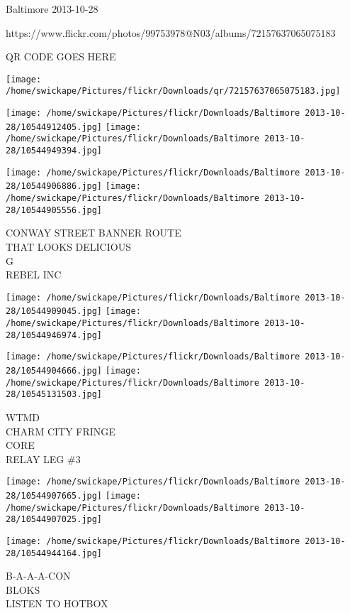 \documentclass[10pt,letterpaper]{article}
\begin{document}
Baltimore 2013-10-28

https://www.flickr.com/photos/99753978@N03/albums/72157637065075183

QR CODE GOES HERE

\texttt{[image: /home/swickape/Pictures/flickr/Downloads/qr/72157637065075183.jpg]}
\pagebreak

\texttt{[image: /home/swickape/Pictures/flickr/Downloads/Baltimore 2013-10-28/10544912405.jpg]}
\texttt{[image: /home/swickape/Pictures/flickr/Downloads/Baltimore 2013-10-28/10544949394.jpg]}

\texttt{[image: /home/swickape/Pictures/flickr/Downloads/Baltimore 2013-10-28/10544906886.jpg]}
\texttt{[image: /home/swickape/Pictures/flickr/Downloads/Baltimore 2013-10-28/10544905556.jpg]}

CONWAY STREET BANNER ROUTE\\
THAT LOOKS DELICIOUS\\
G\\
REBEL INC\\
\pagebreak

\texttt{[image: /home/swickape/Pictures/flickr/Downloads/Baltimore 2013-10-28/10544909045.jpg]}
\texttt{[image: /home/swickape/Pictures/flickr/Downloads/Baltimore 2013-10-28/10544946974.jpg]}

\texttt{[image: /home/swickape/Pictures/flickr/Downloads/Baltimore 2013-10-28/10544904666.jpg]}
\texttt{[image: /home/swickape/Pictures/flickr/Downloads/Baltimore 2013-10-28/10545131503.jpg]}

WTMD\\
CHARM CITY FRINGE\\
CORE\\
RELAY LEG \#3\\
\pagebreak

\texttt{[image: /home/swickape/Pictures/flickr/Downloads/Baltimore 2013-10-28/10544907665.jpg]}
\texttt{[image: /home/swickape/Pictures/flickr/Downloads/Baltimore 2013-10-28/10544907025.jpg]}

\vspace{0.25in}
\texttt{[image: /home/swickape/Pictures/flickr/Downloads/Baltimore 2013-10-28/10544944164.jpg]}

B{-}A{-}A{-}A{-}CON\\
BLOKS\\
LISTEN TO HOTBOX\\
\pagebreak
\end{document}

